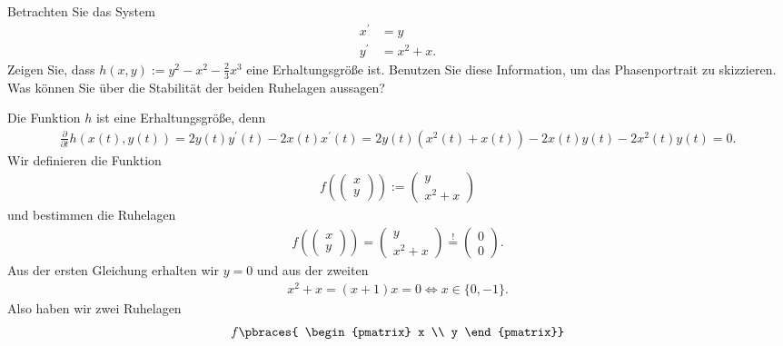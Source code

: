 \begin{exercise}
Betrachten Sie das System
\begin{align*}
  x^{\prime} &= y \\
  y^{\prime} &= x^2 + x.
\end{align*}
Zeigen Sie, dass $h(x,y) := y^2 - x^2 -\frac{2}{3}x^3$ eine Erhaltungsgröße ist.
Benutzen Sie diese Information, um das Phasenportrait zu skizzieren.
Was können Sie über die Stabilität der beiden Ruhelagen aussagen?
\end{exercise}
\begin{solution}
  Die Funktion $h$ ist eine Erhaltungsgröße, denn
  \begin{align*}
      \frac{\partial}{\partial t}h(x(t), y(t)) = 2y(t)y^\prime(t) - 2x(t)x^\prime(t)
       = 2y(t)(x^2(t) + x(t)) - 2x(t)y(t) -2x^2(t)y(t) = 0.
  \end{align*}
  Wir definieren die Funktion
  \begin{align*}
    f\left(\begin{pmatrix}
      x \\ y
    \end{pmatrix}\right) :=
    \begin{pmatrix}
      y \\ x^2 + x
    \end{pmatrix}
  \end{align*}
  und bestimmen die Ruhelagen
  \begin{align*}
    f\left(\begin{pmatrix}
      x \\ y
    \end{pmatrix}\right) =
    \begin{pmatrix}
      y \\ x^2 + x
    \end{pmatrix} \stackrel{!}{=}
    \begin{pmatrix}
      0 \\ 0
    \end{pmatrix}.
  \end{align*}
  Aus der ersten Gleichung erhalten wir $y = 0$
  und aus der zweiten
  \begin{align*}
    x^2 + x = (x + 1)x = 0 \iff x \in \{0,-1\}.
  \end{align*}
  Also haben wir zwei Ruhelagen
  \begin{align*}
    f \pbraces{
    \begin{pmatrix}
      x \\ y
    \end{pmatrix}}

\end{align*}
\end{solution}
